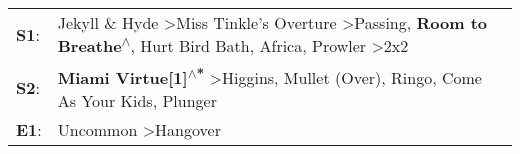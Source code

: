 \begin{supertabular}{p{0.03\textwidth}p{0.92\textwidth}}
 \textbf{S1}:  &  Jekyll \& Hyde\textsuperscript{} \textgreater \enspace Miss Tinkle's Overture\textsuperscript{} \textgreater \enspace Passing\textsuperscript{}, \enspace \textbf{Room to Breathe\textsuperscript{$\wedge$}}, \enspace Hurt Bird Bath\textsuperscript{}, \enspace Africa\textsuperscript{}, \enspace Prowler\textsuperscript{} \textgreater \enspace 2x2\textsuperscript{}  \enspace  \\
 \textbf{S2}:  &                                                                                                           \textbf{Miami Virtue[1]\textsuperscript{$\wedge$*}} \textgreater \enspace Higgins\textsuperscript{}, \enspace Mullet (Over)\textsuperscript{}, \enspace Ringo\textsuperscript{}, \enspace Come As Your Kids\textsuperscript{}, \enspace Plunger\textsuperscript{}  \enspace  \\
 \textbf{E1}:  &                                                                                                                                                                                                                                                                                                 Uncommon\textsuperscript{} \textgreater \enspace Hangover\textsuperscript{}  \enspace  \\
\end{supertabular}
